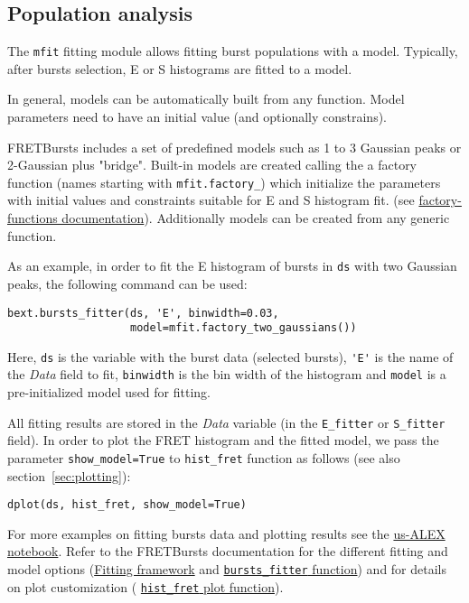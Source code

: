 \subsection{Population analysis}
\label{sec:fretfit}

The \verb|mfit| fitting module allows fitting burst populations with a model.
Typically, after bursts selection, E or S histograms are fitted to a model.

In general, models can be automatically built from any function.
Model parameters need to have an initial value (and optionally
constrains). 

FRETBursts includes a set of predefined models such as 1 to 3 Gaussian
peaks or 2-Gaussian plus "bridge".
Built-in models are created calling the a factory function 
(names starting with \verb|mfit.factory_|) which initialize the parameters
with initial values and constraints suitable for E and S histogram fit.
(see
\href{http://fretbursts.readthedocs.org/en/latest/mfit.html#model-factory-functions}{factory-functions documentation}).
Additionally models can be created from any generic function.

As an example, in order to fit the E histogram of bursts in \verb|ds| with two
Gaussian peaks, the following command can be used:

\begin{verbatim}
bext.bursts_fitter(ds, 'E', binwidth=0.03,
                   model=mfit.factory_two_gaussians())
\end{verbatim}

Here, \verb|ds| is the variable with the burst data (selected bursts),
\verb|'E'| is the name of the \textit{Data} field to fit, \verb|binwidth| is the bin
width of the histogram and \verb|model| is a pre-initialized model used for
fitting.

All fitting results are stored in the \textit{Data} variable (in the \verb|E_fitter| or
\verb|S_fitter| field).
In order to plot the FRET histogram and the fitted model, we pass the parameter
\verb|show_model=True| to \verb|hist_fret| function as follows
(see also section~\ref{sec:plotting}):

\begin{verbatim}
dplot(ds, hist_fret, show_model=True)
\end{verbatim}

For more examples on fitting bursts data and plotting results see the
\href{http://nbviewer.ipython.org/urls/raw.github.com/tritemio/FRETBursts_notebooks/master/notebooks/FRETBursts\%2520-\%2520us-ALEX\%2520smFRET\%2520burst\%2520analysis.ipynb}{us-ALEX notebook}.
Refer to the FRETBursts documentation for the different fitting and model options
(\href{http://fretbursts.readthedocs.org/en/latest/fit.html}{Fitting framework} and
\href{http://fretbursts.readthedocs.org/en/latest/plugins.html#fretbursts.burstlib\_ext.bursts\_fitter}{\texttt{bursts\_fitter} function})
and for details on plot customization (
\href{http://fretbursts.readthedocs.org/en/latest/plots.html#fretbursts.burst_plot.hist_fret}{\texttt{hist\_fret} plot function}).

